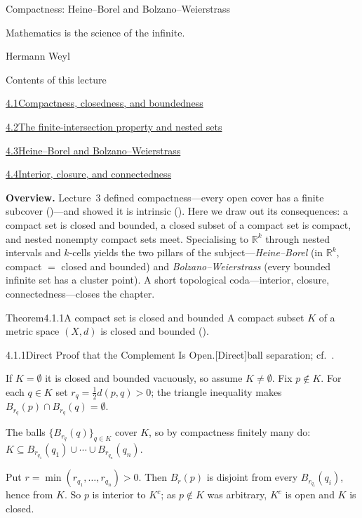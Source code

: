 \documentclass[main.tex]{subfiles}
\begin{document}
%
  {Compactness: Heine--Borel and Bolzano--Weierstrass}

\epigraph{Mathematics is the science of the infinite.}{Hermann Weyl}

\begin{lecturecontents}{Contents of this lecture}
  \item \hyperlink{4.1}{4.1\quad Compactness, closedness, and boundedness}
  \item \hyperlink{4.2}{4.2\quad The finite-intersection property and nested sets}
  \item \hyperlink{4.3}{4.3\quad Heine--Borel and Bolzano--Weierstrass}
  \item \hyperlink{4.4}{4.4\quad Interior, closure, and connectedness}
\end{lecturecontents}

\bigskip
\noindent\textbf{Overview.} Lecture~3 defined compactness---every open cover has a finite subcover
()---and showed it is intrinsic (). Here we draw out its consequences: a
compact set is closed and bounded, a closed subset of a compact set is compact, and nested nonempty
compact sets meet. Specialising to $\mathbb R^k$ through nested intervals and $k$-cells yields the two
pillars of the subject---\emph{Heine--Borel} (in $\mathbb R^k$, compact $=$ closed and bounded) and
\emph{Bolzano--Weierstrass} (every bounded infinite set has a cluster point). A short topological
coda---interior, closure, connectedness---closes the chapter.

\clearpage

\begin{Obj}{Theorem}{4.1.1}{A compact set is closed and bounded}
A compact subset $K$ of a metric space $(X,d)$ is closed and bounded ().
\end{Obj}
\begin{Prf}{4.1.1}{Direct Proof that the Complement Is Open.}{[Direct]\quad ball separation; cf.\ .}
\item If $K=\emptyset$ it is closed and bounded vacuously, so assume $K\neq\emptyset$. Fix $p\notin K$.
  For each $q\in K$ set $r_q=\tfrac12 d(p,q)>0$; the triangle inequality makes
  $B_{r_q}(p)\cap B_{r_q}(q)=\emptyset$.
\item The balls $\{B_{r_q}(q)\}_{q\in K}$ cover $K$, so by compactness finitely many do:
  $K\subseteq B_{r_{q_1}}(q_1)\cup\cdots\cup B_{r_{q_n}}(q_n)$.
\item Put $r=\min(r_{q_1},\dots,r_{q_n})>0$. Then $B_r(p)$ is disjoint from every $B_{r_{q_i}}(q_i)$,
  hence from $K$. So $p$ is interior to $K^c$; as $p\notin K$ was arbitrary, $K^c$ is open and $K$ is closed.
\end{Prf}
\end{document}
